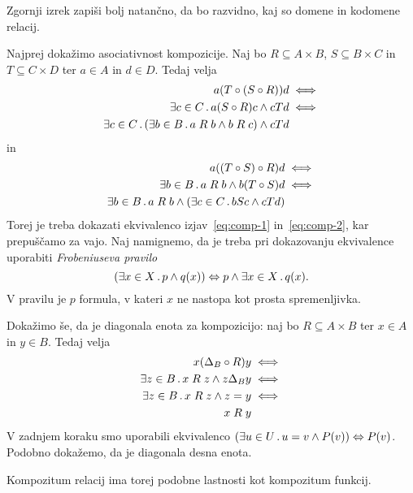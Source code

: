 \begin{naloga}
  Zgornji izrek zapiši bolj natančno, da bo razvidno, kaj so domene in kodomene relacij.
\end{naloga}

\begin{dokaz}
  Najprej dokažimo asociativnost kompozicije.
  Naj bo $R \subseteq A \times B$, $S \subseteq B \times C$ in $T \subseteq C \times D$ ter $a \in A$ in $d \in D$. Tedaj velja
  \begin{align}
    a (T \circ (S \circ R)) d &\iff  \notag \\
    \some{c \in C} a (S \circ R) c \land c T d &\iff \notag \\
    \some{c \in C} (\some{b \in B} a \rel{R} b \land b \rel{R} c) \land c T d \label{eq:comp-1}
  \end{align}
  in
  \begin{align}
    a ((T \circ S) \circ R) d &\iff \notag \\
    \some{b \in B} a \rel{R} b \land b (T \circ S) d &\iff \notag \\
    \some{b \in B} a \rel{R} b \land (\some{c \in C} b S c \land c T d) \label{eq:comp-2}
  \end{align}
  Torej je treba dokazati ekvivalenco izjav~\eqref{eq:comp-1} in~\eqref{eq:comp-2}, kar prepuščamo za vajo. Naj namignemo, da je treba pri dokazovanju ekvivalence uporabiti \emph{Frobeniuseva pravilo}
  \begin{equation*}
    (\some{x \in X} p \land q(x)) \liff p \land \some{x \in X} q(x).
  \end{equation*}
  V pravilu je $p$ formula, v kateri $x$ ne nastopa kot prosta spremenljivka.

  Dokažimo še, da je diagonala enota za kompozicijo: naj bo $R \subseteq A \times B$ ter $x \in A$ in $y \in B$. Tedaj velja
  \begin{align*}
    x (\diag[B] \circ R) y &\iff \\
    \some{z \in B} x \rel{R} z \land z \diag[B] y  &\iff \\
    \some{z \in B} x \rel{R} z \land z = y &\iff \\
    x \rel{R} y
  \end{align*}
  V zadnjem koraku smo uporabili ekvivalenco $(\some{u \in U} u = v \land P(v)) \liff P(v)$. Podobno dokažemo, da je diagonala desna enota.
\end{dokaz}

Kompozitum relacij ima torej podobne lastnosti kot kompozitum funkcij.

